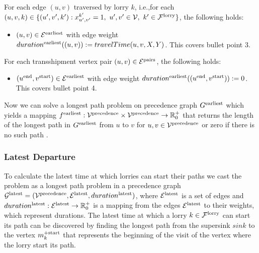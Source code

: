 For each edge $(u,v)$ traversed by lorry $k$, i.e.,for each
 $(u,v,k) \in  \{ (u',v',k') : x^{k'}_{u',v'} = 1,
\ u',v' \in \mathcal V,
\ k' \in \mathcal F^{\rm lorry} \}$,
the following holds:
\begin{itemize}
  \item
  $(u,v) \in \mathcal E^{\rm earliest}$
  with edge weight
  $duration^{\rm earliest}((u,v)) := travelTime(u,v,X,Y)$.
  This covers bullet point 3.
\end{itemize}


For each transshipment vertex pair $(u,v) \in \mathcal E^{\rm pairs}$,
the following holds:
\begin{itemize}
  \item
    $(u^{\rm end},v^{\rm start}) \in \mathcal E^{\rm earliest}$
    with edge weight
    $duration^{\rm earliest}((u^{\rm end},v^{\rm start})) := 0$.
    This covers bullet point 4.
\end{itemize}

Now we can solve a  longest path problem on precedence graph
$G^{\rm earliest}$
which yields a mapping
$f^{\rm earliest}: \mathcal V^{\rm precedence} \times \mathcal V^{\rm precedence} \rightarrow \mathbb{R}^+_0$
that returns the length of the longest path in $G^{\rm earliest}$ from $u$ to $v$ for  $u,v \in \mathcal V^{\rm precedence}$ or zero if there is no such path .  \\




\subsubsection{Latest Departure}

To calculate the latest time at which lorries can start their paths we cast the problem as a longest path problem in a precedence graph
$\mathcal G^{\rm latest} = (\mathcal V^{\rm precedence},\mathcal E^{\rm latest} , duration^{\rm latest})$, where
$\mathcal E^{\rm latest}$
is a set of edges and
$duration^{\rm latest}:\mathcal E^{\rm latest} \rightarrow \mathbb R^+_0$
is a mapping from
the edges  $\mathcal E^{\rm latest}$ to their weights, which represent durations.
The latest time at which a lorry $k \in \mathcal  F^{\rm lorry }$ can start its path can be discovered by finding the longest path from the supersink $sink$
to the vertex $m^{+ \rm start}_k$ that represents the beginning of the visit of the vertex where the lorry start its path.\\

